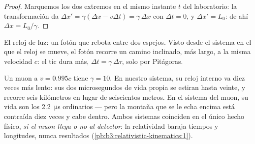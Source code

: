 \begin{proof}
Marquemos los dos extremos en el mismo instante $t$ del laboratorio: la
transformación da $\Delta x' = \gamma(\Delta x - v\Delta t) = \gamma\,\Delta x$
con $\Delta t = 0$, y $\Delta x' = L_0$: de ahí $\Delta x = L_0/\gamma$.
\end{proof}

\begin{omfigure}

{\small El reloj de luz: un fotón que rebota entre dos espejos. Visto desde
el sistema en el que el reloj se mueve, el fotón recorre un camino
inclinado, más largo, a la misma velocidad $c$: el tic dura más,
$\Delta t = \gamma\,\Delta\tau$, solo por Pitágoras.}
\end{omfigure}

\begin{example}\label{ex:b3:relativistic-kinematics:muon}
Un muon a $v = 0.995c$ tiene $\gamma = 10$. En nuestro sistema, su reloj
interno va diez veces más lento: sus dos microsegundos de vida propia se
estiran hasta veinte, y recorre seis kilómetros en lugar de seiscientos
metros. En el sistema del muon, su vida son los \qty{2.2}{\micro s}
ordinarios --- pero la montaña que se le echa encima está contraída diez
veces y cabe dentro. Ambos sistemas coinciden en el único hecho físico,
\emph{si el muon llega o no al detector}: la relatividad baraja tiempos y
longitudes, nunca resultados (\cref{pb:b3:relativistic-kinematics:1}).
\end{example}

